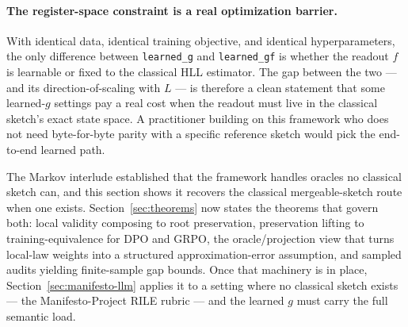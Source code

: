 \paragraph{The register-space constraint is a real optimization barrier.}
With identical data, identical training objective, and identical
hyperparameters, the only difference between \texttt{learned\_g} and
\texttt{learned\_gf} is whether the readout $f$ is learnable or fixed to
the classical HLL estimator. The gap between the two --- and its
direction-of-scaling with $L$ --- is therefore a clean statement that
some learned-$g$ settings pay a real cost when the readout must live in
the classical sketch's exact state space. A practitioner building on this
framework who does not need byte-for-byte parity with a specific
reference sketch would pick the end-to-end learned path.

The Markov interlude established that the framework handles oracles no
classical sketch can, and this section shows it recovers the classical
mergeable-sketch route when one exists. Section~\ref{sec:theorems} now states the
theorems that govern both: local validity composing to root
preservation, preservation lifting to training-equivalence for DPO and
GRPO, the oracle/projection view that turns local-law weights into a
structured approximation-error assumption, and sampled audits yielding
finite-sample gap bounds. Once that
machinery is in place, Section~\ref{sec:manifesto-llm} applies it to a
setting where no classical sketch exists --- the Manifesto-Project RILE
rubric --- and the learned $g$ must carry the full semantic load.
